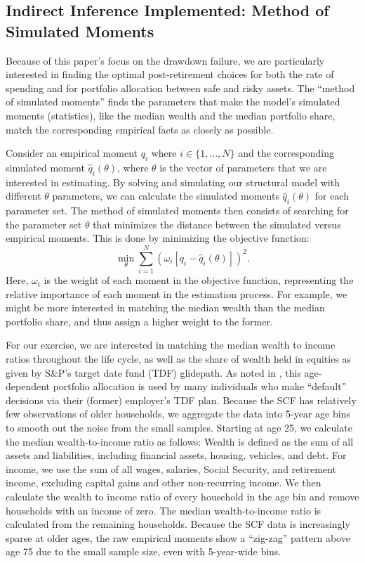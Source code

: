 \documentclass[12pt,letterpaper, fleqn]{article}
\begin{document}
\subsection{Indirect Inference Implemented: Method of Simulated Moments}

Because of this paper's focus on the drawdown failure, we are particularly interested in finding the optimal post-retirement choices for both the rate of spending and for portfolio allocation between safe and risky assets.
The ``method of simulated moments'' finds the parameters that make the model's simulated moments (statistics), like the median wealth and the median portfolio share, match the corresponding empirical facts as closely as possible.

Consider an empirical moment $q_i$ where $i \in \{1,...,N\}$ and the corresponding simulated moment $\hat{q}_i(\theta)$, where $\theta$ is the vector of parameters that we are interested in estimating.
By solving and simulating our structural model with different $\theta$ parameters, we can calculate the simulated moments $\hat{q}_i(\theta)$ for each parameter set.
The method of simulated moments then consists of searching for the parameter set $\theta$ that minimizes the distance between the simulated versus empirical moments.
This is done by minimizing the objective function:
\begin{equation}
\min_{\theta} \sum_{i=1}^{N}  \left( \omega_i [q_i - \hat{q}_i(\theta) ] \right)^2.
\end{equation}
Here, $\omega_i$ is the weight of each moment in the objective function, representing the relative importance of each moment in the estimation process.
For example, we might be more interested in matching the median wealth than the median portfolio share, and thus assign a higher weight to the former.

For our exercise, we are interested in matching the median wealth to income ratios throughout the life cycle, as well as the share of wealth held in equities as given by S\&P's target date fund (TDF) glidepath.
As noted in \cite{Aboagye2024}, this age-dependent portfolio allocation is used by many individuals who make ``default'' decisions via their (former) employer's TDF plan.
Because the SCF has relatively few observations of older households, we aggregate the data into 5-year age bins to smooth out the noise from the small samples.
Starting at age 25, we calculate the median wealth-to-income ratio as follows: Wealth is defined as the sum of all assets and liabilities, including financial assets, housing, vehicles, and debt.
For income, we use the sum of all wages, salaries, Social Security, and retirement income, excluding capital gains and other non-recurring income.
We then calculate the wealth to income ratio of every household in the age bin and remove households with an income of zero.
The median wealth-to-income ratio is calculated from the remaining households.
Because the SCF data is increasingly sparse at older ages, the raw empirical moments show a ``zig-zag'' pattern above age 75 due to the small sample size, even with 5-year-wide bins.
\end{document}

